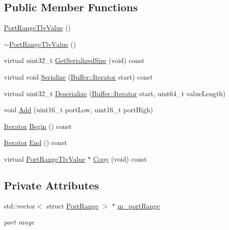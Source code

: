 \subsection*{Public Member Functions}
\begin{DoxyCompactItemize}
\item 
\hyperlink{classns3_1_1PortRangeTlvValue_a476313d47ebce836c4e781621e24ea96}{Port\+Range\+Tlv\+Value} ()
\item 
\hyperlink{classns3_1_1PortRangeTlvValue_afa447187db7e65865cf7ed606dcc2d9f}{$\sim$\+Port\+Range\+Tlv\+Value} ()
\item 
virtual uint32\+\_\+t \hyperlink{classns3_1_1PortRangeTlvValue_a1c61a37737b74bcfde3c76afbeedba92}{Get\+Serialized\+Size} (void) const 
\item 
virtual void \hyperlink{classns3_1_1PortRangeTlvValue_a545b526f9efa04af7c25aaa0a1ee28b4}{Serialize} (\hyperlink{classns3_1_1Buffer_1_1Iterator}{Buffer\+::\+Iterator} start) const 
\item 
virtual uint32\+\_\+t \hyperlink{classns3_1_1PortRangeTlvValue_a344115631756605d834928795a30439c}{Deserialize} (\hyperlink{classns3_1_1Buffer_1_1Iterator}{Buffer\+::\+Iterator} start, uint64\+\_\+t value\+Length)
\item 
void \hyperlink{classns3_1_1PortRangeTlvValue_ac78b2513ddfc9a1fbdf62d9e836b68a5}{Add} (uint16\+\_\+t port\+Low, uint16\+\_\+t port\+High)
\item 
\hyperlink{classns3_1_1PortRangeTlvValue_a04bc61dc4b03a8e91d6ec855c8c88a69}{Iterator} \hyperlink{classns3_1_1PortRangeTlvValue_ac68f5adeab36baccbfcae71d4646a717}{Begin} () const 
\item 
\hyperlink{classns3_1_1PortRangeTlvValue_a04bc61dc4b03a8e91d6ec855c8c88a69}{Iterator} \hyperlink{classns3_1_1PortRangeTlvValue_a6257431e684159e512700c43ec3cba5e}{End} () const 
\item 
virtual \hyperlink{classns3_1_1PortRangeTlvValue}{Port\+Range\+Tlv\+Value} $\ast$ \hyperlink{classns3_1_1PortRangeTlvValue_a4d7ce210e61de54a89831e7cb50f1a55}{Copy} (void) const 
\end{DoxyCompactItemize}
\subsection*{Private Attributes}
\begin{DoxyCompactItemize}
\item 
std\+::vector$<$ struct \hyperlink{structns3_1_1PortRangeTlvValue_1_1PortRange}{Port\+Range} $>$ $\ast$ \hyperlink{classns3_1_1PortRangeTlvValue_a645324f803fd3cb32002e51da7ac1389}{m\+\_\+port\+Range}
\begin{DoxyCompactList}\small\item\em port range \end{DoxyCompactList}\end{DoxyCompactItemize}


